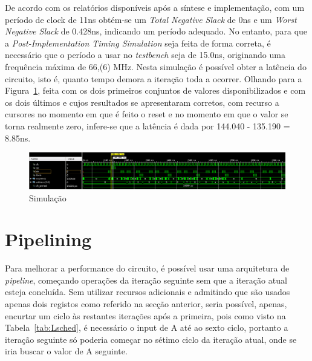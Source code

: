 \documentclass{article} %
\begin{document}
		\noindent De acordo com os relatórios disponíveis após a síntese e implementação, com um período de clock de 11ns obtém-se um \emph{Total Negative Slack} de 0ns e um \emph{Worst Negative Slack} de 0.428ns, indicando um período adequado. No entanto, para que a \emph{Post-Implementation Timing Simulation} seja feita de forma correta, é necessário que o período a usar no \emph{testbench} seja de 15.0ns, originando uma frequência máxima de 66,(6) MHz. Nesta simulação é possível obter a latência do circuito, isto é, quanto tempo demora a iteração toda a ocorrer. Olhando para a Figura~\ref{fig:Sim}, feita com os dois primeiros conjuntos de valores disponibilizados e com os dois últimos e cujos resultados se apresentaram corretos, com recurso a cursores no momento em que é feito o reset e no momento em que o valor se torna realmente zero, infere-se que a latência é dada por 144.040 - 135.190 = 8.85ns.\\ 

		\begin{figure}[ht]
			\begin{center}
				\includegraphics[width=6.5in]{sim.png}
				\caption{Simulação}
				\label{fig:Sim}
			\end{center}
		\end{figure}


	\section{Pipelining}

		Para melhorar a performance do circuito, é possível usar uma arquitetura de \emph{pipeline}, começando operações da iteração seguinte sem que a iteração atual esteja concluída. Sem utilizar recursos adicionais e admitindo que são usados apenas dois registos como referido na secção anterior, seria possível, apenas, encurtar um ciclo às restantes iterações após a primeira, pois como visto na Tabela~\ref{tab:Lsched}, é necessário o input de A até ao sexto ciclo, portanto a iteração seguinte só poderia começar no sétimo ciclo da iteração atual, onde se iria buscar o valor de A seguinte.\\

		\clearpage
\end{document}

